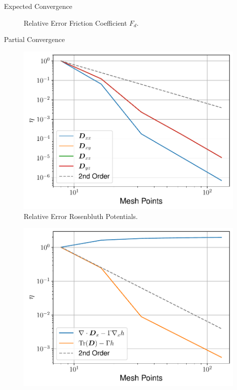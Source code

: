 \begin{frame}[c]{Expected Convergence}
\begin{multicols}{2}
\begin{figure}[!htb]
      \caption{Relative Error Friction Coefficient $F_d$.}
      \label{fig:Fd_convergence}
    \end{figure}
    \end{multicols}
\end{frame}

\begin{frame}[c]{Partial Convergence}
    \begin{multicols}{2}
    \begin{figure}[!htb]
        \centering
        \captionsetup{justification=centering}
      \includegraphics[width=1.05\linewidth]{figures/D_convergence_sigma20.pdf}
      \caption{Relative Error Rosenbluth Potentials.}
      \label{fig:D_convergence}
    \end{figure}
    \columnbreak
    \begin{figure}[!htb]
        \centering
        \captionsetup{justification=centering}
      \includegraphics[width=1.05\linewidth]{figures/identities_convergence_sigma20.pdf}

\end{figure}
\end{multicols}
\end{frame}
